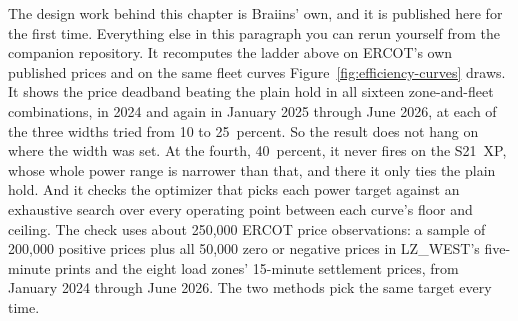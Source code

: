 The design work behind this chapter is Braiins' own, and it is published here for the first time. Everything else in this paragraph you can rerun yourself from the companion repository. It recomputes the ladder above on ERCOT's own published prices and on the same fleet curves Figure~\ref{fig:efficiency-curves} draws. It shows the price deadband beating the plain hold in all sixteen zone-and-fleet combinations, in 2024 and again in January 2025 through June 2026, at each of the three widths tried from 10 to 25~percent. So the result does not hang on where the width was set. At the fourth, 40~percent, it never fires on the S21~XP, whose whole power range is narrower than that, and there it only ties the plain hold. And it checks the optimizer that picks each power target against an exhaustive search over every operating point between each curve's floor and ceiling. The check uses about 250,000 ERCOT price observations: a sample of 200,000 positive prices plus all 50,000 zero or negative prices in LZ\_WEST's five-minute prints and the eight load zones' 15-minute settlement prices, from January 2024 through June 2026. The two methods pick the same target every time. %

